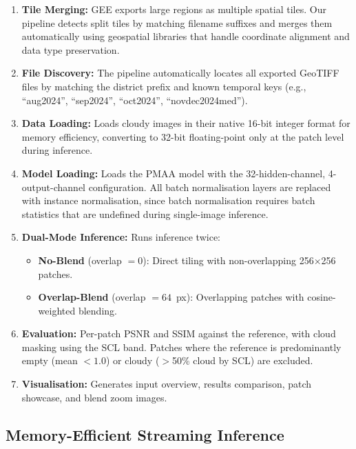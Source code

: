 \documentclass[12pt,a4paper]{article}
\begin{document}
\begin{enumerate}[leftmargin=2em]
    \item \textbf{Tile Merging:} GEE exports large regions as multiple spatial tiles. Our pipeline detects split tiles by matching filename suffixes and merges them automatically using geospatial libraries that handle coordinate alignment and data type preservation.
    
    \item \textbf{File Discovery:} The pipeline automatically locates all exported GeoTIFF files by matching the district prefix and known temporal keys (e.g., ``aug2024'', ``sep2024'', ``oct2024'', ``novdec2024med'').
    
    \item \textbf{Data Loading:} Loads cloudy images in their native 16-bit integer format for memory efficiency, converting to 32-bit floating-point only at the patch level during inference.
    
    \item \textbf{Model Loading:} Loads the PMAA model with the 32-hidden-channel, 4-output-channel configuration. All batch normalisation layers are replaced with instance normalisation, since batch normalisation requires batch statistics that are undefined during single-image inference.
    
    \item \textbf{Dual-Mode Inference:} Runs inference twice:
    \begin{itemize}
        \item \textbf{No-Blend} (overlap $= 0$): Direct tiling with non-overlapping 256$\times$256 patches.
        \item \textbf{Overlap-Blend} (overlap $= 64$~px): Overlapping patches with cosine-weighted blending.
    \end{itemize}
    
    \item \textbf{Evaluation:} Per-patch PSNR and SSIM against the reference, with cloud masking using the SCL band. Patches where the reference is predominantly empty (mean $< 1.0$) or cloudy ($>$50\% cloud by SCL) are excluded.
    
    \item \textbf{Visualisation:} Generates input overview, results comparison, patch showcase, and blend zoom images.
\end{enumerate}

\subsection{Memory-Efficient Streaming Inference}
\end{document}
